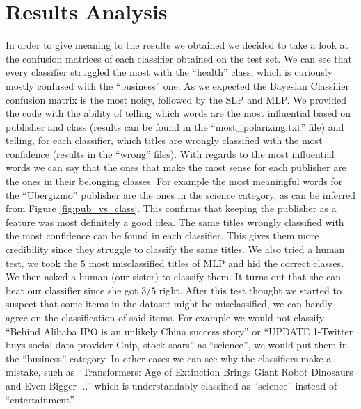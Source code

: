 \documentclass[10pt,a4paper]{report}
\begin{document}
\section{Results Analysis}
In order to give meaning to the results we obtained we decided to take a look at the confusion matrices of each classifier obtained on the test set. We can see that every classifier struggled the most with the \enquote{health} class, which is curiously mostly confused with the \enquote{business} one. As we expected the Bayesian Classifier confusion matrix is the most noisy, followed by the SLP and MLP. We provided the code with the ability of telling which words are the most influential based on publisher and class (results can be found in the \enquote{most\_polarizing.txt} file) and telling, for each classifier, which titles are wrongly classified with the most confidence (results in the \enquote{wrong} files). With regards to the most influential words we can say that the ones that make the most sense for each publisher are the ones in their belonging classes. For example the most meaningful words for the \enquote{Ubergizmo} publisher are the ones in the science category, as can be inferred from Figure \ref{fig:pub_vs_class}. This confirms that keeping the publisher as a feature was most definitely a good idea. The same titles wrongly classified with the most confidence can be found in each classifier. This gives them more credibility since they struggle to classify the same titles. We also tried a human test, we took the $5$ most misclassified titles of MLP and hid the correct classes. We then asked a human (our sister) to classify them. It turns out that she can beat our classifier since she got $3/5$ right. After this test thought we started to suspect that some items in the dataset might be misclassified, we can hardly agree on the classification of said items. For example we would not classify \enquote{Behind Alibaba IPO is an unlikely China success story} or \enquote{UPDATE 1-Twitter buys social data provider Gnip, stock soars} as \enquote{science}, we would put them in the \enquote{business} category. In other cases we can see why the classifiers make a mistake, such as \enquote{Transformers: Age of Extinction Brings Giant Robot Dinosaurs and Even Bigger  ...} which is understandably classified as \enquote{science} instead of \enquote{entertainment}.     
\end{document}
